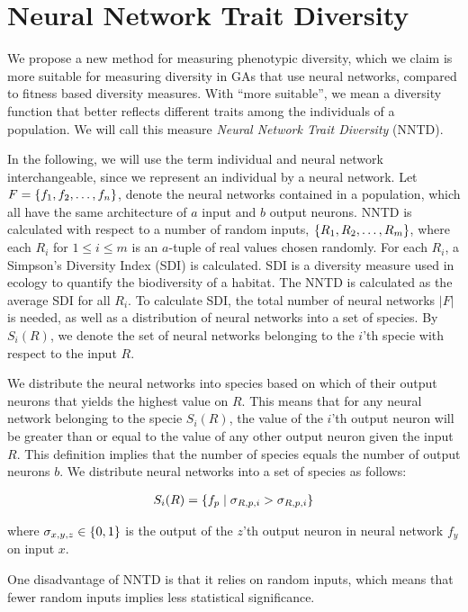 \section{Neural Network Trait Diversity}
We propose a new method for measuring phenotypic diversity, which we claim is more suitable for measuring diversity in GAs that use neural networks, compared to fitness based diversity measures. With ``more suitable'', we mean a diversity function that better reflects different traits among the individuals of a population.
We will call this measure \emph{Neural Network Trait Diversity} (NNTD).

In the following, we will use the term individual and neural network interchangeable, since we represent an individual by a neural network.  Let $F = \{ f_1, f_2, \dots, f_n \}$, denote the neural networks contained in a population, which all have the same architecture of $a$ input and $b$ output neurons.
NNTD is calculated with respect to a number of random inputs, $\{ R_1, R_2, \dots, R_m \}$, where each $R_i$ for $1 \leq i \leq m$ is an $a$-tuple of real values chosen randomly.
For each $R_i$, a Simpson's Diversity Index (SDI) is calculated.
SDI is a diversity measure used in ecology to quantify the biodiversity of a habitat. 
The NNTD is calculated as the average SDI for all $R_i$.
To calculate SDI, the total number of neural networks $\lvert F \lvert$ is needed, as well as a distribution of neural networks into a set of species. By $S_i(R)$, we denote the set of neural networks belonging to the $i$'th specie with respect to the input $R$.

We distribute the neural networks into species based on which of their output neurons that yields the highest value on $R$. This means that for any neural network belonging to the specie $S_i(R)$, the value of the $i$'th output neuron will be greater than or equal to the value of any other output neuron given the input $R$. 
This definition implies that the number of species equals the number of output neurons $b$. 
We distribute neural networks into a set of species as follows:

\begin{equation*}\label{eq:species}
  \begin{split}
    S_i(R) = \{ f_p \mid \sigma_{R,p,i} > \sigma_{R,p,i} \}
  \end{split}
\end{equation*}

where $\sigma_{x ,y, z} \in \{ 0, 1 \}$ is the output of the $z$'th output neuron in neural network $f_y$ on input $x$.

One disadvantage of NNTD is that it relies on random inputs, which means that fewer random inputs implies less statistical significance.